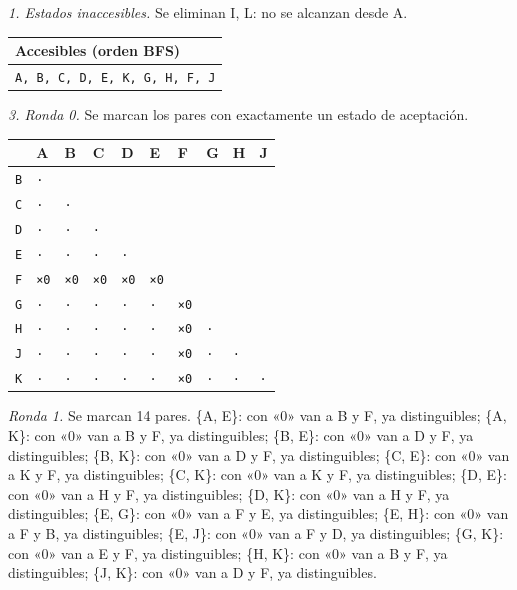 \documentclass[11pt]{article}
\begin{document}
\textit{1. Estados inaccesibles.} Se eliminan I, L: no se alcanzan desde A.
\begin{center}\footnotesize\begin{tabular}{l}\toprule
Accesibles (orden BFS) \\\midrule
\texttt{A, B, C, D, E, K, G, H, F, J} \\
\bottomrule\end{tabular}\end{center}
\textit{3. Ronda 0.} Se marcan los pares con exactamente un estado de aceptación.
\begin{center}\footnotesize\begin{tabular}{llllllllll}\toprule
 & A & B & C & D & E & F & G & H & J \\\midrule
\texttt{B} & \texttt{·} & \texttt{} & \texttt{} & \texttt{} & \texttt{} & \texttt{} & \texttt{} & \texttt{} & \texttt{} \\
\texttt{C} & \texttt{·} & \texttt{·} & \texttt{} & \texttt{} & \texttt{} & \texttt{} & \texttt{} & \texttt{} & \texttt{} \\
\texttt{D} & \texttt{·} & \texttt{·} & \texttt{·} & \texttt{} & \texttt{} & \texttt{} & \texttt{} & \texttt{} & \texttt{} \\
\texttt{E} & \texttt{·} & \texttt{·} & \texttt{·} & \texttt{·} & \texttt{} & \texttt{} & \texttt{} & \texttt{} & \texttt{} \\
\texttt{F} & \texttt{×0} & \texttt{×0} & \texttt{×0} & \texttt{×0} & \texttt{×0} & \texttt{} & \texttt{} & \texttt{} & \texttt{} \\
\texttt{G} & \texttt{·} & \texttt{·} & \texttt{·} & \texttt{·} & \texttt{·} & \texttt{×0} & \texttt{} & \texttt{} & \texttt{} \\
\texttt{H} & \texttt{·} & \texttt{·} & \texttt{·} & \texttt{·} & \texttt{·} & \texttt{×0} & \texttt{·} & \texttt{} & \texttt{} \\
\texttt{J} & \texttt{·} & \texttt{·} & \texttt{·} & \texttt{·} & \texttt{·} & \texttt{×0} & \texttt{·} & \texttt{·} & \texttt{} \\
\texttt{K} & \texttt{·} & \texttt{·} & \texttt{·} & \texttt{·} & \texttt{·} & \texttt{×0} & \texttt{·} & \texttt{·} & \texttt{·} \\
\bottomrule\end{tabular}\end{center}
\textit{Ronda 1.} Se marcan 14 pares. \{A, E\}: con «0» van a B y F, ya distinguibles; \{A, K\}: con «0» van a B y F, ya distinguibles; \{B, E\}: con «0» van a D y F, ya distinguibles; \{B, K\}: con «0» van a D y F, ya distinguibles; \{C, E\}: con «0» van a K y F, ya distinguibles; \{C, K\}: con «0» van a K y F, ya distinguibles; \{D, E\}: con «0» van a H y F, ya distinguibles; \{D, K\}: con «0» van a H y F, ya distinguibles; \{E, G\}: con «0» van a F y E, ya distinguibles; \{E, H\}: con «0» van a F y B, ya distinguibles; \{E, J\}: con «0» van a F y D, ya distinguibles; \{G, K\}: con «0» van a E y F, ya distinguibles; \{H, K\}: con «0» van a B y F, ya distinguibles; \{J, K\}: con «0» van a D y F, ya distinguibles.
\end{document}
